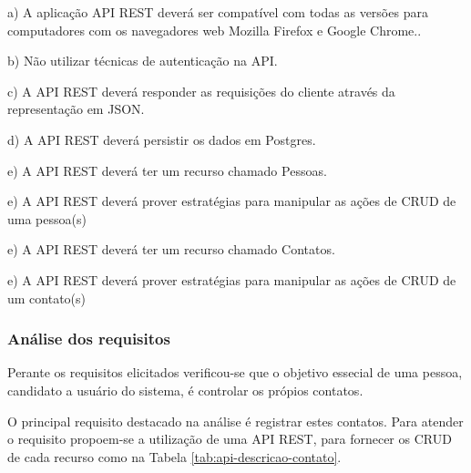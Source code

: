   \begin{compactitem}
    \item[a)] A aplicação \ac{API} \ac{REST} deverá ser compatível com todas as versões para computadores com os navegadores 
    web Mozilla Firefox e Google Chrome..
    \item[b)] Não utilizar técnicas de autenticação na API.
    \item[c)] A \ac{API} \ac{REST} deverá responder as requisições do cliente através da representação em JSON.
    \item[d)] A \ac{API} \ac{REST} deverá persistir os dados em Postgres.
    \item[e)] A \ac{API} \ac{REST} deverá ter um recurso chamado Pessoas.
    \item[e)] A \ac{API} \ac{REST} deverá prover estratégias para manipular as ações de CRUD de uma pessoa(s)
    \item[e)] A \ac{API} \ac{REST} deverá ter um recurso chamado Contatos.
    \item[e)] A \ac{API} \ac{REST} deverá prover estratégias para manipular as ações de CRUD de um contato(s)
  \end{compactitem}
  
\subsubsection{Análise dos requisitos}
  
  Perante os requisitos elicitados verificou-se que o objetivo essecial de uma pessoa, candidato a usuário
  do sistema, é controlar os própios contatos.
  
  O principal requisito destacado na análise é registrar estes contatos. Para atender o requisito
  propoem-se a utilização de uma \ac{API} \ac{REST}, para fornecer os \ac{CRUD} de cada recurso
  como na Tabela \ref{tab:api-descricao-contato}.
 
